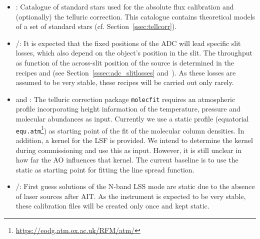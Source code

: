 \begin{itemize}
    \item {}: Catalogue of standard stars used for the absolute flux calibration and (optionally) the telluric correction. This catalogue contains theoretical models of a set of standard stars (cf. Section~\ref{ssec:tellcorr}). 
    \item {}/: It is expected that the fixed positions of the \ac{ADC} will lead specific slit losses, which also depend on the object's position in the slit. The throughput as function of the across-slit position of the source is determined in the recipes  and  (see Section~\ref{sssec:adc_slitlosses} and~\cite{METIS-calibration_plan}). As these losses are assumed to be very stable, these recipes will be carried out only rarely.
    \item {} and : The telluric correction package \texttt{molecfit} requires an atmospheric profile incorporating height information of the temperature, pressure and molecular abundances as input. Currently we use a static profile (equatorial \texttt{equ.atm}\footnote{\url{https://eodg.atm.ox.ac.uk/RFM/atm/}}) as starting point of the fit of the molecular column densities. In addition, a kernel for the \ac{LSF} is provided. We intend to determine the kernel during commissioning and use this as input. However, it is still unclear in how far the \ac{AO} influences that kernel. The current baseline is to use the static  as starting point for fitting the line spread function.
    \item {}/: First guess solutions of the N-band LSS mode are static due to the absence of laser sources after \ac{AIT}. As the instrument is expected to be very stable, these calibration files will be created only once and kept static.
\end{itemize}
